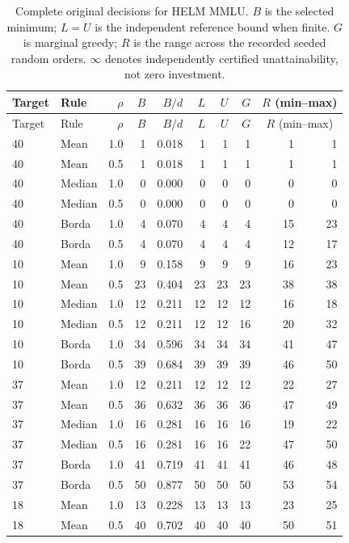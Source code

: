 \begin{longtable}{llrrr rr r rr}
\caption{Complete original decisions for HELM MMLU. $B$ is the selected minimum; $L=U$ is the independent reference bound when finite. $G$ is marginal greedy; $R$ is the range across the recorded seeded random orders. $\infty$ denotes independently certified unattainability, not zero investment.}\\
\toprule
Target & Rule & $\rho$ & $B$ & $B/d$ & $L$ & $U$ & $G$ & \multicolumn{2}{c}{$R$ (min--max)} \\
\midrule\endfirsthead
\toprule Target & Rule & $\rho$ & $B$ & $B/d$ & $L$ & $U$ & $G$ & \multicolumn{2}{c}{$R$ (min--max)} \\ \midrule\endhead
40 & Mean & 1.0 & 1 & 0.018 & 1 & 1 & 1 & 1 & 1 \\
40 & Mean & 0.5 & 1 & 0.018 & 1 & 1 & 1 & 1 & 1 \\
40 & Median & 1.0 & 0 & 0.000 & 0 & 0 & 0 & 0 & 0 \\
40 & Median & 0.5 & 0 & 0.000 & 0 & 0 & 0 & 0 & 0 \\
40 & Borda & 1.0 & 4 & 0.070 & 4 & 4 & 4 & 15 & 23 \\
40 & Borda & 0.5 & 4 & 0.070 & 4 & 4 & 4 & 12 & 17 \\
10 & Mean & 1.0 & 9 & 0.158 & 9 & 9 & 9 & 16 & 23 \\
10 & Mean & 0.5 & 23 & 0.404 & 23 & 23 & 23 & 38 & 38 \\
10 & Median & 1.0 & 12 & 0.211 & 12 & 12 & 12 & 16 & 18 \\
10 & Median & 0.5 & 12 & 0.211 & 12 & 12 & 16 & 20 & 32 \\
10 & Borda & 1.0 & 34 & 0.596 & 34 & 34 & 34 & 41 & 47 \\
10 & Borda & 0.5 & 39 & 0.684 & 39 & 39 & 39 & 46 & 50 \\
37 & Mean & 1.0 & 12 & 0.211 & 12 & 12 & 12 & 22 & 27 \\
37 & Mean & 0.5 & 36 & 0.632 & 36 & 36 & 36 & 47 & 49 \\
37 & Median & 1.0 & 16 & 0.281 & 16 & 16 & 16 & 19 & 22 \\
37 & Median & 0.5 & 16 & 0.281 & 16 & 16 & 22 & 47 & 50 \\
37 & Borda & 1.0 & 41 & 0.719 & 41 & 41 & 41 & 46 & 48 \\
37 & Borda & 0.5 & 50 & 0.877 & 50 & 50 & 50 & 53 & 54 \\
18 & Mean & 1.0 & 13 & 0.228 & 13 & 13 & 13 & 23 & 25 \\
18 & Mean & 0.5 & 40 & 0.702 & 40 & 40 & 40 & 50 & 51 \\

\end{longtable}
